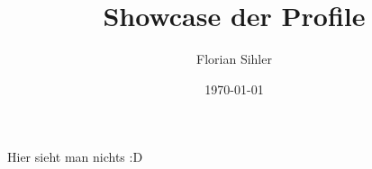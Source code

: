 \documentclass{article}
\title{Showcase der Profile}
\author{Florian Sihler}
\date{\today}
\begin{document}
\maketitle

Hier sieht man nichts :D
\end{document}
